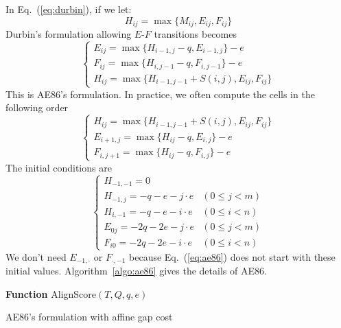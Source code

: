 \documentclass{bioinfo}
\begin{document}
In Eq.~(\ref{eq:durbin}), if we let:
\[H_{ij}=\max\{M_{ij},E_{ij},F_{ij}\}\]
Durbin's formulation allowing $E$-$F$ transitions becomes
\begin{equation*}
\left\{\begin{array}{l}
E_{ij}=\max\{H_{i-1,j}-q, E_{i-1,j}\} - e \\
F_{ij}=\max\{H_{i,j-1}-q, F_{i,j-1}\} - e \\
H_{ij}=\max\{H_{i-1,j-1}+S(i,j), E_{ij}, F_{ij}\}
\end{array}\right.
\end{equation*}
This is AE86's formulation. In practice, we often compute the cells in the
following order
\begin{equation}\label{eq:ae86}
\left\{\begin{array}{l}
H_{ij}=\max\{H_{i-1,j-1}+S(i,j), E_{ij}, F_{ij}\}\\
E_{i+1,j}=\max\{H_{ij}-q, E_{i,j}\} - e \\
F_{i,j+1}=\max\{H_{ij}-q, F_{i,j}\} - e
\end{array}\right.
\end{equation}
The initial conditions are
\begin{equation}
\left\{\begin{array}{ll}
H_{-1,-1}=0\\
H_{-1,j}=-q-e-j\cdot e & (0\le j<m)\\
H_{i,-1}=-q-e-i\cdot e & (0\le i<n)\\
E_{0j}=-2q-2e-j\cdot e & (0\le j<m)\\
F_{i0}=-2q-2e-i\cdot e & (0\le i<n)
\end{array}\right.
\end{equation}
We don't need $E_{-1,\cdot}$ or $F_{\cdot,-1}$ because Eq.~(\ref{eq:ae86})
does not start with these initial values. Algorithm~\ref{algo:ae86} gives
the details of AE86.

\begin{algorithm}[tb]
\DontPrintSemicolon
\footnotesize
{}
\BlankLine
\textbf{Function} {\sc AlignScore}$(T,Q,q,e)$
\caption{AE86's formulation with affine gap cost}\label{algo:ae86}
\end{algorithm}
\end{document}
